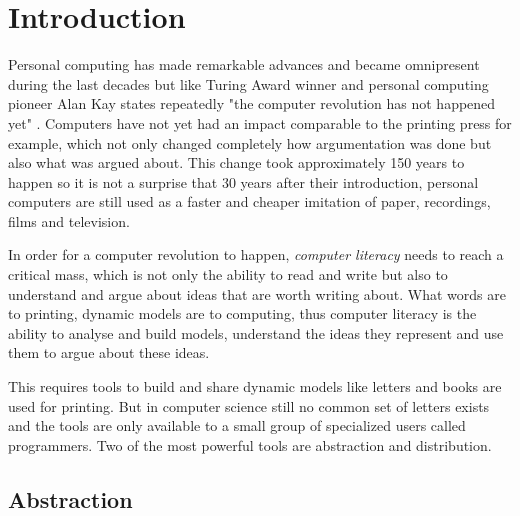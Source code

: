 


\graphicspath{{figures/introduction/}}


\chapter{Introduction}
\label{chap:introduction}

Personal computing has made remarkable advances and became omnipresent during the last decades but like Turing Award winner and personal computing pioneer Alan Kay states repeatedly "the computer revolution has not happened yet" \cite{ComputerRevolution}. Computers have not yet had an impact comparable to the printing press for example, which not only changed completely how argumentation was done but also what was argued about. This change took approximately 150 years to happen so it is not a surprise that 30 years after their introduction, personal computers are still used as a faster and cheaper imitation of paper, recordings, films and television.

In order for a computer revolution to happen, \textit{computer literacy} needs to reach a critical mass, which is not only the ability to read and write but also to understand and argue about ideas that are worth writing about. What words are to printing, dynamic models are to computing, thus computer literacy is the ability to analyse and build models, understand the ideas they represent and use them to argue about these ideas.

This requires tools to build and share dynamic models like letters and books are used for printing. But in computer science still no common set of letters exists and the tools are only available to a small group of specialized users called programmers. Two of the most powerful tools are abstraction and distribution.

\section{Abstraction}

